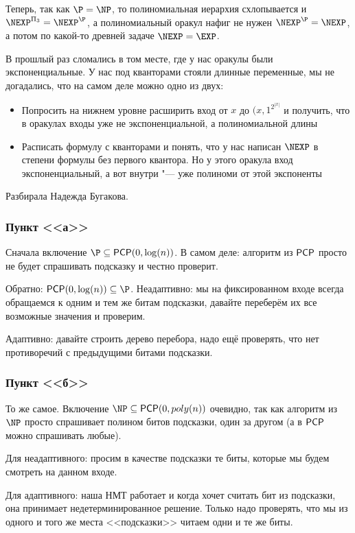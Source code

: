 	Теперь, так как $\P=\NP$, то полиномиальная иерархия схлопывается и $\NEXP^{\Pi_3}=\NEXP^{\P}$,
	а полиномиальный оракул нафиг не нужен $\NEXP^\P=\NEXP$, а потом по какой-то древней задаче $\NEXP=\EXP$.

	\begin{Rem}
		В прошлый раз сломались в том месте, где у нас оракулы были экспоненциальные.
		У нас под кванторами стояли длинные переменные, мы не догадались, что на самом деле можно одно из двух:
		\begin{itemize}
			\item Попросить на нижнем уровне расширить вход от $x$ до $(x, 1^{2^{|x|}}$ и получить, что в оракулах входы уже не экспоненциальной, а полиномиальной длины
			\item
				Расписать формулу с кванторами и понять, что у нас написан $\NEXP$ в степени формулы без первого квантора.
				Но у этого оракула вход экспоненциальный, а вот внутри "--- уже полиноми от этой экспоненты
		\end{itemize}
	\end{Rem}

	Разбирала Надежда Бугакова.

	\subsubsection{Пункт <<а>>}
		Сначала включение $\P\subseteq \PCP(0, \log(n))$.
		В самом деле: алгоритм из $\mathsf{PCP}$ просто не будет спрашивать подсказку и честно проверит.

		Обратно: $\PCP(0, \log(n)) \subseteq \P$.
		Неадаптивно: мы на фиксированном входе всегда обращаемся к одним и тем же битам подсказки, давайте
		переберём их все возможные значения и проверим.

		Адаптивно: давайте строить дерево перебора, надо ещё проверять, что нет противоречий с предыдущими битами подсказки.

	\subsubsection{Пункт <<б>>}
		То же самое.
		Включение $\NP\subseteq \PCP(0, poly(n))$ очевидно, так как алгоритм из $\NP$ просто спрашивает
		полином битов подсказки, один за другом (а в $\mathsf{PCP}$ можно спрашивать любые).

		Для неадаптивного: просим в качестве подсказки те биты, которые мы будем смотреть на данном входе.

		Для адаптивного: наша НМТ работает и когда хочет считать бит из подсказки, она принимает недетерминированное решение.
		Только надо проверять, что мы из одного и того же места <<подсказки>> читаем одни и те же биты.

